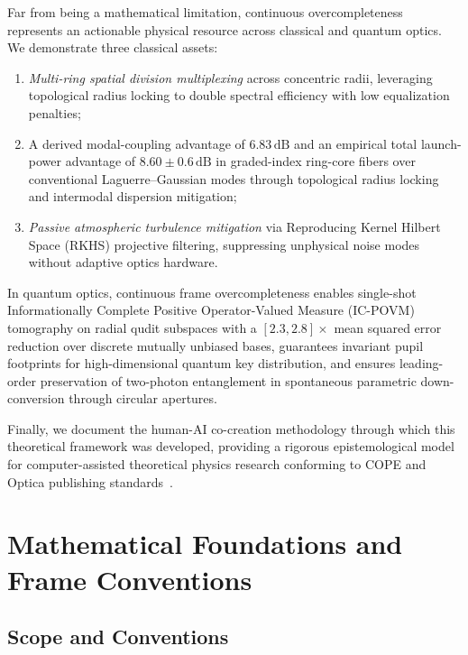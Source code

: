\documentclass{optica-article}
\begin{document}
Far from being a mathematical limitation, continuous overcompleteness represents an actionable physical resource across classical and quantum optics. We demonstrate three classical assets:
\begin{enumerate}
    \item \emph{Multi-ring spatial division multiplexing} across concentric radii, leveraging topological radius locking to double spectral efficiency with low equalization penalties;
    \item A derived modal-coupling advantage of $6.83\,\text{dB}$ and an empirical total launch-power advantage of $8.60 \pm 0.6\,\text{dB}$ in graded-index ring-core fibers over conventional Laguerre--Gaussian modes through topological radius locking and intermodal dispersion mitigation;
    \item \emph{Passive atmospheric turbulence mitigation} via Reproducing Kernel Hilbert Space (RKHS) projective filtering, suppressing unphysical noise modes without adaptive optics hardware.
\end{enumerate}
In quantum optics, continuous frame overcompleteness enables single-shot Informationally Complete Positive Operator-Valued Measure (IC-POVM) tomography on radial qudit subspaces with a $[2.3, 2.8]\times$ mean squared error reduction over discrete mutually unbiased bases, guarantees invariant pupil footprints for high-dimensional quantum key distribution, and ensures leading-order preservation of two-photon entanglement in spontaneous parametric down-conversion through circular apertures.

Finally, we document the human-AI co-creation methodology through which this theoretical framework was developed, providing a rigorous epistemological model for computer-assisted theoretical physics research conforming to COPE and Optica publishing standards~\cite{Jauhiainen2026,Haber2025,OToole2024,VillaescusaNavarro2026,Chandra2026TheoPhysEval,Kacena2024}.

\section{Mathematical Foundations and Frame Conventions}
\label{sec:foundations}

\subsection{Scope and Conventions}
\label{sec:scope_conventions}
\end{document}
